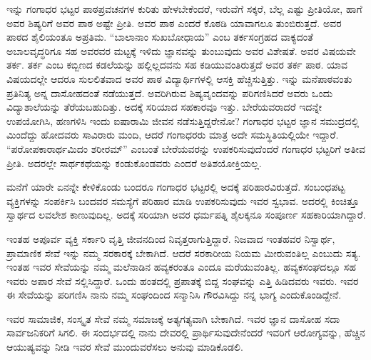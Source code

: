 ಇನ್ನು ಗಂಗಾಧರ ಭಟ್ಟರ ಪಾಠಪ್ರವಚನಗಳ ಕುರಿತು ಹೇಳಬೇಕೆಂದರೆ, ಇರುವೆಗೆ ಸಕ್ಕರೆ, ಬೆಲ್ಲ ಎಷ್ಟು ಪ್ರೀತಿಯೋ, ಹಾಗೆ ಅವರ ಶಿಷ್ಯರಿಗೆ ಅವರ ಪಾಠ ಅಷ್ಟೇ ಪ್ರೀತಿ. ಅವರ ಪಾಠ ಎಂದರೆ ಕೊಠಡಿ ಯಾವಾಗಲೂ ತುಂಬಿರುತ್ತದೆ. ಅವರ ಪಾಠದ ಶೈಲಿಯಂತೂ ಅಪ್ರತಿಮ. “ಬಾಲಾನಾಂ ಸುಖಬೋಧಾಯ” ಎಂಬ ತರ್ಕಸಂಗ್ರಹದ ವಾಕ್ಯದಂತೆ ಅಬಾಲವೃದ್ಧರಿಗೂ ಸಹ ಅವರವರ ಮಟ್ಟಕ್ಕೆ ಇಳಿದು ಜ್ಞಾನವನ್ನು ತುಂಬುವುದು ಅವರ ವಿಶೇಷತೆ. ಅವರ ವಿಷಯವೇ ತರ್ಕ. ತರ್ಕ ಎಂಬ ಕಬ್ಬಿಣದ ಕಡಲೆಯನ್ನು ಹಲ್ಲಿಲ್ಲದವನು ಸಹ ಕಡಿಯುವಂತಿರುತ್ತದೆ ಅವರ ತರ್ಕ ಪಾಠ. ಯಾವ ವಿಷಯದಲ್ಲೇ ಆದರೂ ಸುಲಲಿತವಾದ ಅವರ ಪಾಠ ವಿದ್ಯಾರ್ಥಿಗಳಲ್ಲಿ ಆಸಕ್ತಿ ಹೆಚ್ಚಿಸುತ್ತಿತ್ತು. ಇನ್ನು ಮನೆಪಾಠವಂತು ಪ್ರತಿನಿತ್ಯ ಅನ್ನ ದಾಸೋಹದಂತೆ ನಡೆಯುತ್ತದೆ. ಅವರಿಗಿರುವ ಶಿಷ್ಯವೃಂದವನ್ನು ಪರಿಗಣಿಸಿದರೆ ಅವರು ಒಂದು ವಿದ್ಯಾಶಾಲೆಯನ್ನು ತೆರೆಯಬಹುದಿತ್ತು. ಅದಕ್ಕೆ ಸರಿಯಾದ ಸಹಕಾರವೂ ಇತ್ತು. ಬೇರೆಯವರಾದರೆ ಇದನ್ನೇ ಉಪಯೋಗಿಸಿ, ಹಣಗಳಿಸಿ ಇಂದು ಐಷಾರಾಮಿ ಜೀವನ ನಡೆಸುತ್ತಿದ್ದರೇನೋ? ಗಂಗಾಧರ ಭಟ್ಟರ ಜ್ಞಾನ ಸಮುದ್ರದಲ್ಲಿ ಮಿಂದೆದ್ದು ಹೋದವರು ಸಾವಿರಾರು ಮಂದಿ, ಆದರೆ ಗಂಗಾಧರರು ಮಾತ್ರ ಅದೇ ಸಮಸ್ಥಿತಿಯಲ್ಲಿಯೇ ಇದ್ದಾರೆ. “ಪರೋಪಕಾರಾರ್ಥಮಿದಂ ಶರೀರಮ್” ಎಂಬಂತೆ ಬೇರೆಯವರನ್ನು ಉಪಕರಿಸುವುದೆಂದರೆ ಗಂಗಾಧರ ಭಟ್ಟರಿಗೆ ಅತೀವ ಪ್ರೀತಿ. ಅದರಲ್ಲೇ ಸಾರ್ಥಕಥೆಯನ್ನು ಕಂಡುಕೊಂಡವರು ಎಂದರೆ ಅತಿಶಯೋಕ್ತಿಯಲ್ಲ.

ಮನೆಗೆ ಯಾರೇ ಏನನ್ನೇ ಕೇಳಿಕೊಂಡು ಬಂದರೂ ಗಂಗಾಧರ ಭಟ್ಟರಲ್ಲಿ ಅದಕ್ಕೆ ಪರಿಹಾರವಿರುತ್ತದೆ. ಸಂಬಂಧಪಟ್ಟ ವ್ಯಕ್ತಿಗಳನ್ನು ಸಂಪರ್ಕಿಸಿ ಬಂದವರ ಸಮಸ್ಯೆಗೆ ಪರಿಹಾರ ಮಾಡಿ ಉಪಕರಿಸುವುದು ಇವರ ಸ್ವಭಾವ. ಅದರಲ್ಲಿ ಕಿಂಚಿತ್ತೂ ಸ್ವಾರ್ಥದ ಲವಲೇಶ ಕಾಣುವುದಿಲ್ಲ. ಅದಕ್ಕೆ ಸರಿಯಾಗಿ ಅವರ ಧರ್ಮಪತ್ನಿ ಶೈಲಕ್ಕನೂ ಸಂಪೂರ್ಣ ಸಹಕಾರಿಯಾಗಿದ್ದಾರೆ.

ಇಂತಹ ಅಪೂರ್ವ ವ್ಯಕ್ತಿ ಸರ್ಕಾರಿ ವೃತ್ತಿ ಜೀವನದಿಂದ ನಿವೃತ್ತರಾಗುತ್ತಿದ್ದಾರೆ. ನಿಜವಾದ ಇಂತಹವರ ನಿಸ್ವಾರ್ಥ, ಪ್ರಾಮಾಣಿಕ ಸೇವೆ ಇನ್ನು ನಮ್ಮ ಸರಕಾರಕ್ಕೆ ಬೇಕಾಗಿದೆ. ಆದರೆ ಸರಕಾರೀಯ ನಿಯಮ ಮೀರುವಂತಿಲ್ಲ ಎಂಬುದು ಸತ್ಯ. ಇಂತಹ ಇವರ ಸೇವೆಯನ್ನು ನಮ್ಮ ಮಲೆನಾಡಿನ ಹವ್ಯಕರಂತೂ ಎಂದೂ ಮರೆಯುವಂತಿಲ್ಲ. ಹವ್ಯಕಸಂಘದಲ್ಲೂ ಸಹ ಇವರು ಅಪಾರ ಸೇವೆ ಸಲ್ಲಿಸಿದ್ದಾರೆ. ಒಂದು ಹಂತದಲ್ಲಿ ಪ್ರಪಾತಕ್ಕೆ ಬಿದ್ದ ಸಂಘವನ್ನು ಎತ್ತಿ ಹಿಡಿದವರು ಇವರು. ಇವರ ಈ ಸೇವೆಯನ್ನು ಪರಿಗಣಿಸಿ ನಾನು ನಮ್ಮ ಸಂಘಂದಿಂದ ಸನ್ಮಾನಿಸಿ ಗೌರವಿಸಿದ್ದು ನನ್ನ ಭಾಗ್ಯ ಎಂದುಕೊಂಡಿದ್ದೇನೆ.

ಇವರ ಸಾಮಾಜಿಕ, ಸಂಸ್ಕೃತ ಸೇವೆ ನಮ್ಮ ಸಮಾಜಕ್ಕೆ ಅತ್ಯಗತ್ಯವಾಗಿ ಬೇಕಾಗಿದೆ. ಇವರ ಜ್ಞಾನ ದಾಸೋಹ ಸದಾ ಸಾರ್ವಜನಿಕರಿಗೆ ಸಿಗಲಿ. ಈ ಸಂದರ್ಭದಲ್ಲಿ ನಾನು ದೇವರಲ್ಲಿ ಪ್ರಾರ್ಥಿಸುವುದೇನೆಂದರೆ ಇವರಿಗೆ ಆರೋಗ್ಯವನ್ನು, ಹೆಚ್ಚಿನ ಆಯುಷ್ಯವನ್ನು ನೀಡಿ ಇವರ ಸೇವೆ ಮುಂದುವರೆಸಲು ಅನುವು ಮಾಡಿಕೊಡಲಿ.
